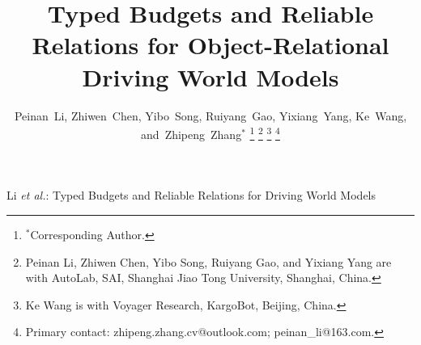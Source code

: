 \documentclass[10pt,journal,compsoc]{IEEEtran}
\begin{document}
\raggedbottom

\title{Typed Budgets and Reliable Relations for Object-Relational Driving World Models}

\author{Peinan~Li,
        Zhiwen~Chen,
        Yibo~Song,
        Ruiyang~Gao,
        Yixiang~Yang,
        Ke~Wang,
        and~Zhipeng~Zhang$^{\ast}$%
\thanks{$^{\ast}$Corresponding Author.}%
\thanks{Peinan Li, Zhiwen Chen, Yibo Song, Ruiyang Gao, and Yixiang Yang are with AutoLab, SAI, Shanghai Jiao Tong University, Shanghai, China.}%
\thanks{Ke Wang is with Voyager Research, KargoBot, Beijing, China.}%
\thanks{Primary contact: zhipeng.zhang.cv@outlook.com; peinan\_li@163.com.}}

%
{Li \MakeLowercase{\textit{et al.}}: Typed Budgets and Reliable Relations for Driving World Models}
\end{document}
